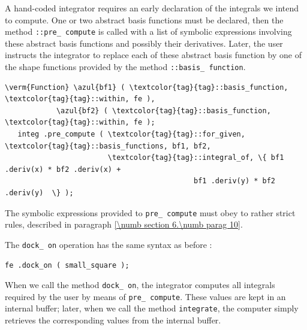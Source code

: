 A hand-coded integrator requires an early declaration of the integrals we intend to compute.
One or two abstract basis functions must be declared, then the method
{\small\tt{}::pre\_\,compute} is called
with a list of symbolic expressions
involving these abstract basis functions and possibly their derivatives.
Later, the user instructs the integrator to replace each of these abstract basis function
by one of the shape functions provided by the method
{\small\tt{}::basis\_\,function}.

\begin{Verbatim}[commandchars=\\\{\},formatcom=\small\tt,frame=single,
   label=parag-\ref{\numb section 6.\numb parag 9}.cpp,rulecolor=\color{coment},
   baselinestretch=0.94,framesep=2mm                                            ]
   \verm{Function} \azul{bf1} ( \textcolor{tag}{tag}::basis_function, \textcolor{tag}{tag}::within, fe ),
            \azul{bf2} ( \textcolor{tag}{tag}::basis_function, \textcolor{tag}{tag}::within, fe );
   integ .pre_compute ( \textcolor{tag}{tag}::for_given, \textcolor{tag}{tag}::basis_functions, bf1, bf2,
                        \textcolor{tag}{tag}::integral_of, \{ bf1 .deriv(x) * bf2 .deriv(x) +
                                            bf1 .deriv(y) * bf2 .deriv(y)  \} );
\end{Verbatim}

The symbolic expressions provided to {\small\tt pre\_\,compute} must obey to rather strict
rules, described in paragraph \ref{\numb section 6.\numb parag 10}.

The {\small\tt dock\_\,on} operation has the same syntax as before :

\begin{Verbatim}[commandchars=\\\{\},formatcom=\small\tt,frame=single,
   label=parag-\ref{\numb section 6.\numb parag 9}.cpp,rulecolor=\color{coment},
   baselinestretch=0.94,framesep=2mm                                            ]
      fe .dock_on ( small_square );
\end{Verbatim}

When we call the method {\small\tt dock\_\,on}, the integrator computes all integrals
required by the user by means of {\small\tt pre\_\,compute}.
These values are kept in an internal buffer; later, when we call the method
{\small\tt integrate}, the computer simply retrieves the corresponding values from
the internal buffer.

